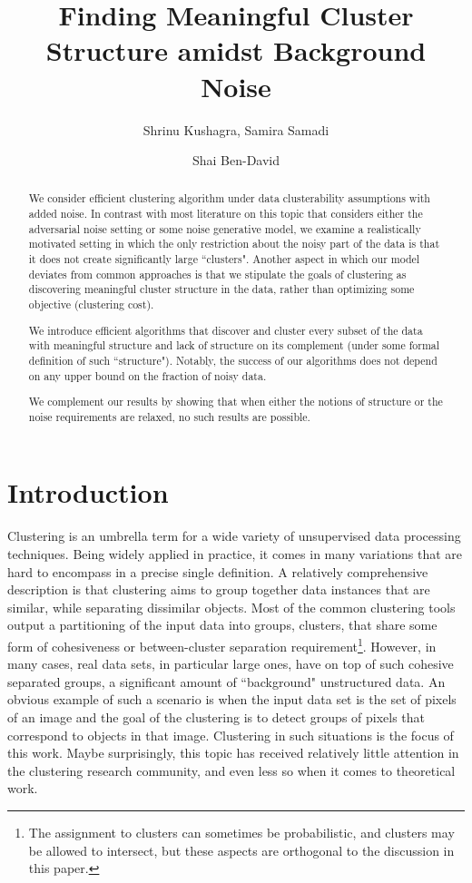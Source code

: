 \documentclass[orivec]{llncs}
\title{Finding Meaningful Cluster Structure amidst Background Noise}
\author{Shrinu Kushagra\inst{1}, Samira Samadi\inst{2} \and Shai Ben-David\inst{1}}
\institute{University of Waterloo, Canada \\ \email{\{skushagr@,shai@cs.\}uwaterloo.ca} \and Georgia Institute of Technology, USA \\ \email{ssamadi6@gatech.edu}}
\begin{document}
\pagestyle{empty}
\maketitle

\begin{abstract}

We consider efficient clustering algorithm under data clusterability assumptions with added noise. In contrast with most literature on this topic that considers either the adversarial noise setting
or some noise generative model, we examine a realistically motivated setting in which the only restriction about the noisy part of the data is that it does not
create significantly large ``clusters". Another aspect in which our model deviates from common approaches is that we stipulate the goals of clustering as discovering meaningful cluster structure in the data, rather than optimizing some objective (clustering cost).

We introduce efficient algorithms that discover and cluster every subset of the data with meaningful structure and lack of structure on its complement (under some formal definition of such ``structure"). Notably, the success of our algorithms does not depend on any upper bound on the fraction of noisy data.

We complement our results by showing that when either the notions of structure or the noise requirements are relaxed, no such results are possible.
\end{abstract}


\section{Introduction}
\label{sec:intro}
Clustering is an umbrella term for a wide variety of unsupervised data processing techniques. Being widely applied in practice, it comes in many variations that are hard to encompass in a precise single definition. A relatively comprehensive description is  that clustering aims to group together data instances that are similar, while separating dissimilar objects. Most of the common clustering tools output a partitioning of the input data into groups, clusters, that share some form of cohesiveness or between-cluster separation requirement\footnote{The assignment to clusters can sometimes be probabilistic, and clusters may be allowed to intersect, but these aspects are orthogonal to the discussion in this paper.}. However, in many cases, real data sets, in particular large ones, have on top of such cohesive separated groups, a significant amount of ``background" unstructured data. An obvious example of such a scenario is when the input data set is the set of pixels of an image and the goal of the clustering is to detect groups of pixels that correspond to objects in that image. Clustering in such situations is the focus of this work. Maybe surprisingly, this topic has received relatively little attention in the clustering research community, and even less so when it comes to theoretical work. 
\end{document}
